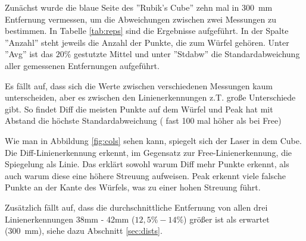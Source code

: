 \documentclass[ngerman,a4paper,parskip=half]{scrartcl}
\begin{document}
Zunächst wurde die blaue Seite des ''Rubik's Cube'' zehn mal in 300~mm Entfernung vermessen, um die Abweichungen zwischen zwei Messungen zu bestimmen. In Tabelle \ref{tab:reps} sind die Ergebnisse aufgeführt. In der Spalte ''Anzahl'' steht jeweils die Anzahl der Punkte, die zum Würfel gehören. Unter ''Avg'' ist das $20 \%$ gestutzte Mittel und unter ''Stdabw'' die Standardabweichung aller gemessenen Entfernungen aufgeführt.

Es fällt auf, dass sich die Werte zwischen verschiedenen Messungen kaum unterscheiden, aber es zwischen den Linienerkennungen z.T. große Unterschiede gibt. So findet Diff die meisten Punkte auf dem Würfel und Peak hat mit Abstand die höchste Standardabweichung ( fast 100 mal höher als bei Free)

Wie man in Abbildung \ref{fig:cols} sehen kann, spiegelt sich der Laser in dem Cube. Die Diff-Linienerkennung erkennt, im Gegensatz zur Free-Linienerkennung, die Spiegelung als Linie. Das erklärt sowohl warum Diff mehr Punkte erkennt, als auch warum diese eine höhere Streuung aufweisen.
Peak erkennt viele falsche Punkte an der Kante des Würfels, was zu einer hohen Streuung führt.

Zusätzlich fällt auf, dass die durchschnittliche Entfernung von allen drei Linienerkennungen 38mm - 42mm ($12,5\%-14\%$) größer ist als erwartet (300~mm), siehe dazu Abschnitt \ref{sec:dists}.
\end{document}
